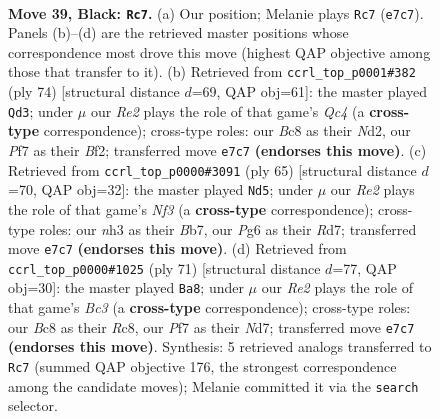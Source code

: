 \documentclass[11pt]{article}
\begin{document}
\clearpage

\begin{figure}[p]\centering
\begin{subfigure}{0.46\textwidth}\centering
\resizebox{\linewidth}{!}{%
\newchessgame
\chessboard[
  setfen={2b3k1/1q2rp1p/6p1/1Bn1Pp2/p4P2/7N/PQP2KPP/1R6 b - - 15 39},
  showmover=false,
  pgfstyle=straightmove, color=movearrow, markmove={e7-c7}
]}
\caption{}
\end{subfigure}\hfill
\begin{subfigure}{0.46\textwidth}\centering
\resizebox{\linewidth}{!}{%
\newchessgame
\chessboard[
  setfen={6k1/3q1p2/p2brnp1/1p6/2QR4/P1P3P1/1P1N1BKP/8 w - - 0 38},
  showmover=false,
  pgfstyle=straightmove, color=movearrow, markmove={c4-d3}
]}
\caption{}
\end{subfigure}
\\[4pt]
\begin{subfigure}{0.46\textwidth}\centering
\resizebox{\linewidth}{!}{%
\newchessgame
\chessboard[
  setfen={6k1/1b1r1p1p/2p2np1/1p2P3/5P1q/1PQ3NP/6PK/2R2B2 b - - 8 33},
  showmover=false,
  pgfstyle=straightmove, color=movearrow, markmove={f6-d5}
]}
\caption{}
\end{subfigure}\hfill
\begin{subfigure}{0.46\textwidth}\centering
\resizebox{\linewidth}{!}{%
\newchessgame
\chessboard[
  setfen={2r3k1/3n1pp1/p1b1pq1p/P7/1RpPP3/2N2PP1/5Q1P/4B1K1 b - - 2 36},
  showmover=false,
  pgfstyle=straightmove, color=movearrow, markmove={c6-a8}
]}
\caption{}
\end{subfigure}
\caption{\textbf{Move 39, Black: \texttt{Rc7}.} (a) Our position; Melanie plays \texttt{Rc7} (\texttt{e7c7}). Panels (b)--(d) are the retrieved master positions whose correspondence most drove this move (highest QAP objective among those that transfer to it). (b) Retrieved from \texttt{ccrl\_top\_p0001\#382} (ply 74) [structural distance $d$=69, QAP obj=61]: the master played \texttt{Qd3}; under $\mu$ our \emph{Re2} plays the role of that game's \emph{Qc4} (a \textbf{cross-type} correspondence); cross-type roles: our \emph{B}c8 as their \emph{N}d2, our \emph{P}f7 as their \emph{B}f2; transferred move \texttt{e7c7} \textbf{(endorses this move)}. (c) Retrieved from \texttt{ccrl\_top\_p0000\#3091} (ply 65) [structural distance $d$=70, QAP obj=32]: the master played \texttt{Nd5}; under $\mu$ our \emph{Re2} plays the role of that game's \emph{Nf3} (a \textbf{cross-type} correspondence); cross-type roles: our \emph{n}h3 as their \emph{B}b7, our \emph{P}g6 as their \emph{R}d7; transferred move \texttt{e7c7} \textbf{(endorses this move)}. (d) Retrieved from \texttt{ccrl\_top\_p0000\#1025} (ply 71) [structural distance $d$=77, QAP obj=30]: the master played \texttt{Ba8}; under $\mu$ our \emph{Re2} plays the role of that game's \emph{Bc3} (a \textbf{cross-type} correspondence); cross-type roles: our \emph{B}c8 as their \emph{R}c8, our \emph{P}f7 as their \emph{N}d7; transferred move \texttt{e7c7} \textbf{(endorses this move)}. Synthesis: 5 retrieved analogs transferred to \texttt{Rc7} (summed QAP objective 176, the strongest correspondence among the candidate moves); Melanie committed it via the \texttt{search} selector.}
\label{fig:thought-m77}
\end{figure}
\end{document}
